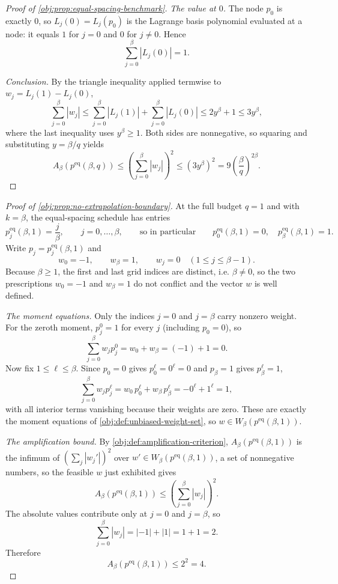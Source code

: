 \begin{proof}[Proof of \cref{obj:prop:equal-spacing-benchmark}]
\emph{The value at \(0\).}
The node \(p_0\) is exactly \(0\), so \(L_j(0)=L_j(p_0)\) is the Lagrange basis polynomial evaluated at a node: it equals \(1\) for \(j=0\) and \(0\) for \(j\ne0\). Hence
\[
\sum_{j=0}^{\beta}|L_j(0)|=1.
\] %

\emph{Conclusion.}
By the triangle inequality applied termwise to \(w_j=L_j(1)-L_j(0)\),
\[
\sum_{j=0}^{\beta}|w_j|
\le
\sum_{j=0}^{\beta}|L_j(1)|+\sum_{j=0}^{\beta}|L_j(0)|
\le
2y^\beta+1
\le
3y^\beta,
\]
where the last inequality uses \(y^\beta\ge1\). %
Both sides are nonnegative, so squaring and substituting \(y=\beta/q\) yields
\[
A_\beta\!\left(p^{\mathrm{eq}}(\beta,q)\right)
\le
\left(\sum_{j=0}^{\beta}|w_j|\right)^2
\le
(3y^\beta)^2
=
9\left(\frac{\beta}{q}\right)^{2\beta}.
\] %
\end{proof}

\begin{proof}[Proof of \cref{obj:prop:no-extrapolation-boundary}]
At the full budget \(q=1\) and with \(k=\beta\), the equal-spacing schedule has entries
\[
p^{\mathrm{eq}}_j(\beta,1)=\frac{j}{\beta},
\qquad j=0,\ldots,\beta,
\qquad\text{so in particular}\qquad
p^{\mathrm{eq}}_0(\beta,1)=0,
\quad
p^{\mathrm{eq}}_\beta(\beta,1)=1 .
\]
Write \(p_j=p^{\mathrm{eq}}_j(\beta,1)\) and
\[
w_0=-1,\qquad w_\beta=1,\qquad w_j=0\quad(1\le j\le\beta-1).
\]
Because \(\beta\ge1\), the first and last grid indices are distinct, i.e. \(\beta\ne0\), so the two prescriptions \(w_0=-1\) and \(w_\beta=1\) do not conflict and the vector \(w\) is well defined. %

\emph{The moment equations.}
Only the indices \(j=0\) and \(j=\beta\) carry nonzero weight. For the zeroth moment, \(p_j^0=1\) for every \(j\) (including \(p_0=0\)), so
\[
\sum_{j=0}^{\beta}w_j p_j^0
=
w_0+w_\beta
=
(-1)+1
=
0.
\] %
Now fix \(1\le\ell\le\beta\). Since \(p_0=0\) gives \(p_0^\ell=0^\ell=0\) and \(p_\beta=1\) gives \(p_\beta^\ell=1\),
\[
\sum_{j=0}^{\beta}w_j p_j^\ell
=
w_0\,p_0^\ell+w_\beta\,p_\beta^\ell
=
-0^\ell+1^\ell
=
1,
\]
with all interior terms vanishing because their weights are zero. These are exactly the moment equations of \cref{obj:def:unbiased-weight-set}, so \(w\in W_\beta(p^{\mathrm{eq}}(\beta,1))\). %

\emph{The amplification bound.}
By \cref{obj:def:amplification-criterion}, \(A_\beta(p^{\mathrm{eq}}(\beta,1))\) is the infimum of \(\left(\sum_j|w_j'|\right)^2\) over \(w'\in W_\beta(p^{\mathrm{eq}}(\beta,1))\), a set of nonnegative numbers, so the feasible \(w\) just exhibited gives
\[
A_\beta\!\left(p^{\mathrm{eq}}(\beta,1)\right)
\le
\left(\sum_{j=0}^{\beta}|w_j|\right)^2.
\] %
The absolute values contribute only at \(j=0\) and \(j=\beta\), so
\[
\sum_{j=0}^{\beta}|w_j|=|-1|+|1|=1+1=2.
\] %
Therefore
\[
A_\beta\!\left(p^{\mathrm{eq}}(\beta,1)\right)\le 2^2=4.
\] %
\end{proof}

